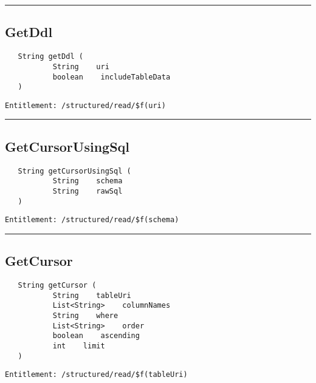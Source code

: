 \rule{12cm}{2pt}
\subsection{GetDdl}
\label{Api:GetDdl}
\begin{Verbatim}
   String getDdl (
           String    uri
           boolean    includeTableData
   )
\end{Verbatim}
\begin{Verbatim}[formatcom=\color{Maroon}]
  Entitlement: /structured/read/$f(uri)
\end{Verbatim}



\rule{12cm}{2pt}
\subsection{GetCursorUsingSql}
\label{Api:GetCursorUsingSql}
\begin{Verbatim}
   String getCursorUsingSql (
           String    schema
           String    rawSql
   )
\end{Verbatim}
\begin{Verbatim}[formatcom=\color{Maroon}]
  Entitlement: /structured/read/$f(schema)
\end{Verbatim}



\rule{12cm}{2pt}
\subsection{GetCursor}
\label{Api:GetCursor}
\begin{Verbatim}
   String getCursor (
           String    tableUri
           List<String>    columnNames
           String    where
           List<String>    order
           boolean    ascending
           int    limit
   )
\end{Verbatim}
\begin{Verbatim}[formatcom=\color{Maroon}]
  Entitlement: /structured/read/$f(tableUri)
\end{Verbatim}




